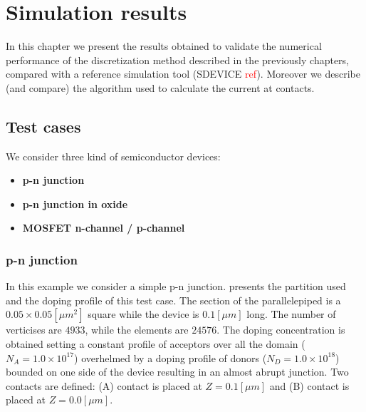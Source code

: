 \chapter{Simulation results}

In this chapter we present the results obtained to validate the numerical performance of the discretization method described in the previously chapters, compared with a reference simulation tool (SDEVICE \textcolor{red}{ref}). Moreover we describe (and compare) the algorithm used to calculate the current at contacts.

\section{Test cases}

We consider three kind of semiconductor devices: 

\begin{itemize}
\item {\bf p-n junction}
\item {\bf p-n junction in oxide}
\item {\bf MOSFET n-channel / p-channel}
\end{itemize}

\subsection{p-n junction}
\label{sec: PN}

In this example we consider a simple p-n junction.  presents the partition used and the doping profile of this test case. The section of the parallelepiped is a $0.05 \times 0.05 [\mu m^2]$ square while the device is $0.1 [\mu m]$ long.  The number of verticises are $4933$, while the elements are $24576$.  The doping concentration is obtained setting a constant profile of acceptors over all the domain ($N_A = 1.0\times 10^{17}$) overhelmed by a doping profile of  donors ($N_D=1.0 \times 10^{18}$) bounded on one side of the device resulting in an almost abrupt junction. 
Two contacts are defined: (A) contact is placed at $Z=0.1[\mu m]$ and (B) contact is placed at $Z=0.0 [\mu m]$.  


\begin{figure}[!t]
\centering
{}
\hspace{1cm}
\label{fig: diodo struttura}
\end{figure}


